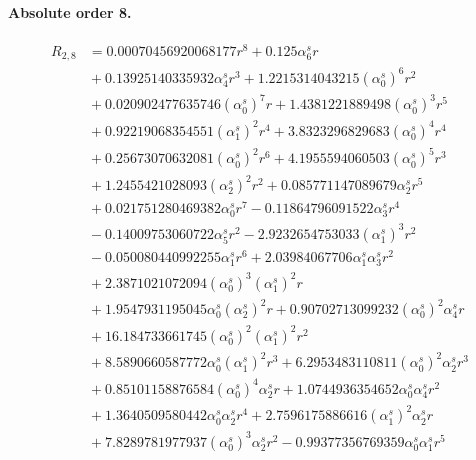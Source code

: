 \documentclass[10pt]{article}
\begin{document}
\paragraph{Absolute order 8.}
\begin{align*}
R_{2,8} &= 0.00070456920068177 r^{8} + 0.125 \alpha_{6}^s r \\
&{}  + 0.13925140335932 \alpha_{4}^s r^{3} + 1.2215314043215 \left(\alpha_{0}^s\right)^{6} r^{2} \\
&{}  + 0.020902477635746 \left(\alpha_{0}^s\right)^{7} r + 1.4381221889498 \left(\alpha_{0}^s\right)^{3} r^{5} \\
&{}  + 0.92219068354551 \left(\alpha_{1}^s\right)^{2} r^{4} + 3.8323296829683 \left(\alpha_{0}^s\right)^{4} r^{4} \\
&{}  + 0.25673070632081 \left(\alpha_{0}^s\right)^{2} r^{6} + 4.1955594060503 \left(\alpha_{0}^s\right)^{5} r^{3} \\
&{}  + 1.2455421028093 \left(\alpha_{2}^s\right)^{2} r^{2} + 0.085771147089679 \alpha_{2}^s r^{5} \\
&{}  + 0.021751280469382 \alpha_{0}^s r^{7} - 0.11864796091522 \alpha_{3}^s r^{4} \\
&{}  - 0.14009753060722 \alpha_{5}^s r^{2} - 2.9232654753033 \left(\alpha_{1}^s\right)^{3} r^{2} \\
&{}  - 0.050080440992255 \alpha_{1}^s r^{6} + 2.03984067706 \alpha_{1}^s \alpha_{3}^s r^{2} \\
&{}  + 2.3871021072094 \left(\alpha_{0}^s\right)^{3} \left(\alpha_{1}^s\right)^{2} r \\
&{}  + 1.9547931195045 \alpha_{0}^s \left(\alpha_{2}^s\right)^{2} r + 0.90702713099232 \left(\alpha_{0}^s\right)^{2} \alpha_{4}^s r \\
&{}  + 16.184733661745 \left(\alpha_{0}^s\right)^{2} \left(\alpha_{1}^s\right)^{2} r^{2} \\
&{}  + 8.5890660587772 \alpha_{0}^s \left(\alpha_{1}^s\right)^{2} r^{3} + 6.2953483110811 \left(\alpha_{0}^s\right)^{2} \alpha_{2}^s r^{3} \\
&{}  + 0.85101158876584 \left(\alpha_{0}^s\right)^{4} \alpha_{2}^s r + 1.0744936354652 \alpha_{0}^s \alpha_{4}^s r^{2} \\
&{}  + 1.3640509580442 \alpha_{0}^s \alpha_{2}^s r^{4} + 2.7596175886616 \left(\alpha_{1}^s\right)^{2} \alpha_{2}^s r \\
&{}  + 7.8289781977937 \left(\alpha_{0}^s\right)^{3} \alpha_{2}^s r^{2} - 0.99377356769359 \alpha_{0}^s \alpha_{1}^s r^{5} \\

\end{align*}
\end{document}
